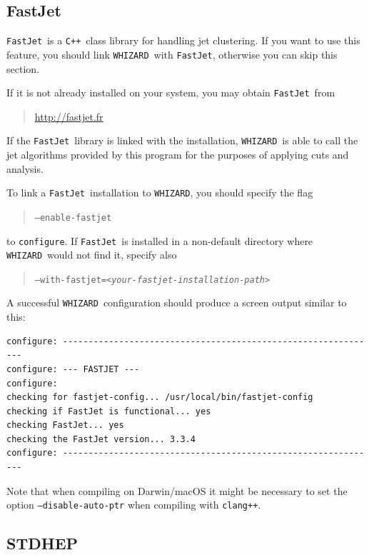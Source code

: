 \documentclass[12pt]{book}
\newcommand{\ttt}[1]{\texttt{#1}}
\newcommand{\whizard}{\ttt{WHIZARD}}
\newcommand{\fastjet}{\ttt{FastJet}}
\newcommand{\cpp}{\ttt{C++}}
\begin{document}

\subsection{FastJet}
\label{sec:fastjet}

\fastjet\ is a \cpp\ class library for handling jet clustering.
If you want to use this feature, you should link \whizard\ with \fastjet,
otherwise you can skip this section.

If it is not already installed on your system, you may obtain
\fastjet\ from
\begin{quote}
  \url{http://fastjet.fr}
\end{quote}
If the \fastjet\ library is linked with the installation, \whizard\ is
able to call the jet algorithms provided by this program for the purposes of
applying cuts and analysis.

To link a \fastjet\ installation to \whizard, you should specify the flag
\begin{quote}
\ttt{--enable-fastjet}
\end{quote}
to \ttt{configure}.  If  \fastjet\ is installed in a non-default directory
where \whizard\ would not find it, specify also
\begin{quote}
\ttt{--with-fastjet=\emph{<your-fastjet-installation-path>}}
\end{quote}

A successful \whizard\ configuration should produce a screen output
similar to this:
\begin{footnotesize}
\begin{verbatim}
configure: --------------------------------------------------------------
configure: --- FASTJET ---
configure:
checking for fastjet-config... /usr/local/bin/fastjet-config
checking if FastJet is functional... yes
checking FastJet... yes
checking the FastJet version... 3.3.4
configure: --------------------------------------------------------------
\end{verbatim}
\end{footnotesize}

Note that when compiling on Darwin/macOS it might be necessary to
set the option \ttt{--disable-auto-ptr} when compiling with
\ttt{clang++}.


\subsection{STDHEP}
\label{sec:stdhep}
\end{document}
